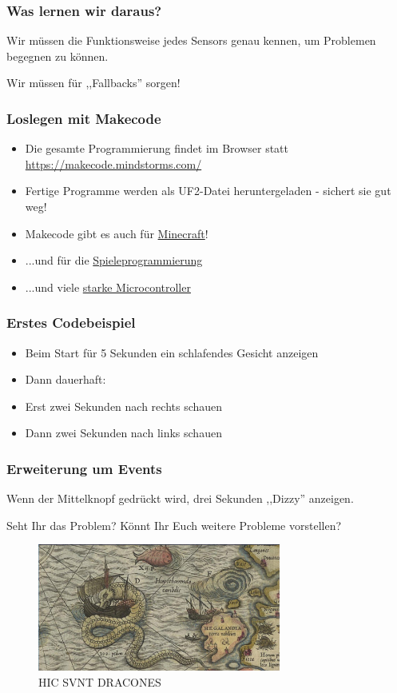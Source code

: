 \documentclass{beamer}
\begin{document}
 
 \begin{frame}
\frametitle{Was lernen wir daraus?}
Wir müssen die Funktionsweise jedes Sensors genau kennen, um Problemen begegnen zu können. 

Wir müssen für ,,Fallbacks'' sorgen!
\end{frame}
 
\begin{frame}
\frametitle{Loslegen mit Makecode}
\begin{itemize}
\item 
Die gesamte Programmierung findet im Browser statt 
\href{https://makecode.mindstorms.com/}{https://makecode.mindstorms.com/}
\item Fertige Programme werden als UF2-Datei heruntergeladen - sichert sie gut weg!
\item Makecode gibt es auch für \href{https://makecode.minecraft.com/}{Minecraft}!
\item ...und für die \href{https://arcade.makecode.com/}{Spieleprogrammierung}
\item ...und viele \href{https://makecode.adafruit.com/}{starke Microcontroller}
\end{itemize}
\end{frame}
 
\begin{frame}
\frametitle{Erstes Codebeispiel}
\begin{itemize}
\item Beim Start für 5 Sekunden ein schlafendes Gesicht anzeigen
\item Dann dauerhaft:
\item Erst zwei Sekunden nach rechts schauen
\item Dann zwei Sekunden nach links schauen
\end{itemize}
\end{frame}
 
\begin{frame}
\frametitle{Erweiterung um Events}
Wenn der Mittelknopf gedrückt wird, drei Sekunden ,,Dizzy'' anzeigen.

Seht Ihr das Problem? Könnt Ihr Euch weitere Probleme vorstellen?

\begin{figure}
  \includegraphics[width=8cm]{hic.jpg}
  \caption{HIC SVNT DRACONES}
  \label{fig:hic1}
\end{figure}


\end{frame}
 
\end{document}
